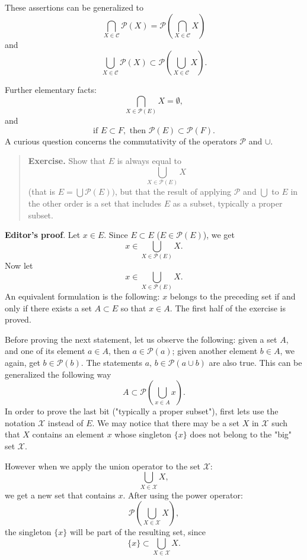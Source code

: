 These assertions can be generalized to
\[
	\bigcap_{X \in \mathcal{C}} \mathcal{P}(X) = \mathcal{P}\left(\bigcap_{X \in \mathcal{C}} X\right)
\]
and
\[
	\bigcup_{X \in \mathcal{C}} \mathcal{P}(X) \subset \mathcal{P}\left(\bigcup_{X \in \mathcal{C}} X\right).
\]

Further elementary facts:
\[
	\bigcap_{X \in \mathcal{P}(E)} X = \emptyset,
\]
and
\[
	\text{if } E \subset F, \text{ then } \mathcal{P}(E) \subset \mathcal{P}(F).
\]
A curious question concerns the commutativity of the operators $\mathcal{P}$ and $\cup$.

\begin{quote}
	\textbf{Exercise.} Show that $E$ is always equal to 
	\[
		\bigcup_{X \in \mathcal{P}(E)} X
	\]
	(that is $E = \bigcup \mathcal{P}(E))$, but that the result of applying $\mathcal{P}$ and $\bigcup$ to $E$ in the other order is a set that includes $E$ as a subset, typically a proper subset.
\end{quote}

\textbf{Editor's proof}. Let $x \in E$. Since $E \subset E$ ($E \in \mathcal{P}(E)$), we get
\[
	x \in \bigcup_{X \in \mathcal{P}(E)} X.
\]
Now let
\[
	x \in \bigcup_{X \in \mathcal{P}(E)} X.
\]
An equivalent formulation is the following: $x$ belongs to the preceding set if and only if there exists a set $A \subset E$ so that $x \in A$. The first half of the exercise is proved. 

Before proving the next statement, let us observe the following: given a set $A$, and one of its element $a \in A$, then $a \in \mathcal{P}(a)$; given another element $b \in A$, we again, get $b \in \mathcal{P}(b)$. The statements $a, \, b \in \mathcal{P}(a \cup b)$ are also true. This can be generalized the following way
\[
	A \subset \mathcal{P}\left(\bigcup_{x \in A} x\right).
\]
In order to prove the last bit ("typically a proper subset"), first lets use the notation $\mathcal{X}$ instead of $E$. We may notice that there may be a set $X$ in $\mathcal{X}$ such that $X$ contains an element $x$ whose singleton $\{x\}$ does not belong to the "big" set $\mathcal{X}$.

However when we apply the union operator to the set $\mathcal{X}$:
\[
	\bigcup_{X \in \mathcal{X}} X,
\]
we get a new set that contains $x$. After using the power operator:
\[
	\mathcal{P}\left(\bigcup_{X \in \mathcal{X}} X\right),
\]
the singleton $\{x\}$ will be part of the resulting set, since
\[
	\{x\} \subset \bigcup_{X \in \mathcal{X}} X.
\]